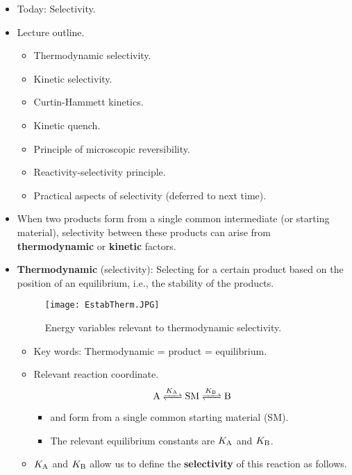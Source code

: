 \documentclass[../notes.tex]{subfiles}
\begin{document}
\begin{itemize}
\begin{itemize}
\begin{itemize}
        \end{itemize}
    \end{itemize}
    \item Today: Selectivity.
    \item Lecture outline.
    \begin{itemize}
        \item Thermodynamic selectivity.
        \item Kinetic selectivity.
        \item Curtin-Hammett kinetics.
        \item Kinetic quench.
        \item Principle of microscopic reversibility.
        \item Reactivity-selectivity principle.
        \item Practical aspects of selectivity (deferred to next time).
    \end{itemize}
    \item When two products form from a single common intermediate (or starting material), selectivity between these products can arise from \textbf{thermodynamic} or \textbf{kinetic} factors.
    \pagebreak
    \item \textbf{Thermodynamic} (selectivity): Selecting for a certain product based on the position of an equilibrium, i.e., the stability of the products.
    \begin{figure}[h!]
        \centering
        \texttt{[image: EstabTherm.JPG]}
        \caption{Energy variables relevant to thermodynamic selectivity.}
        \label{fig:EstabTherm}
    \end{figure}
    \begin{itemize}
        \item Key words: Thermodynamic = product = equilibrium.
        \item Relevant reaction coordinate.
        \begin{equation*}
            \ce{A <=>[$K_{\ce{A}}$] SM <=>[$K_{\ce{B}}$] B}
        \end{equation*}
        \begin{itemize}
            \item {} and  form from a single common starting material (SM).
            \item The relevant equilibrium constants are $K_{\ce{A}}$ and $K_{\ce{B}}$.
        \end{itemize}
        \item $K_{\ce{A}}$ and $K_{\ce{B}}$ allow us to define the \textbf{selectivity} of this reaction as follows.

\end{itemize}
\end{itemize}
\end{document}
